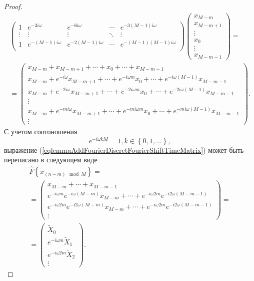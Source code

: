 \begin{proof}
\begin{eqnarray}
\begin{pmatrix}
1 & e^{-3 i \omega} & e^{-6 i \omega} & \cdots & 
e^{-3 \left( M - 1 \right) i \omega} \\
\vdots & \vdots & \vdots & \ddots & \vdots \\
1 & e^{-\left( M - 1 \right) i \omega} & e^{-2\left( M - 1 \right) i \omega} & \cdots & 
e^{- \left( M - 1 \right)\left( M - 1 \right) i \omega} \\
\end{pmatrix}
\begin{pmatrix}
x_{M - m} \\
x_{M - m + 1}\\ 
\vdots \\
x_0 \\
\vdots \\
x_{M - m - 1}
\end{pmatrix} = 
\nonumber \\
=
\begin{pmatrix}
x_{M - m} + x_{M - m + 1} + \cdots + x_0 + \cdots +
x_{M - m - 1}\\
x_{M - m} + 
e^{-i \omega} x_{M - m + 1} + 
\cdots + 
e^{-i \omega m  } x_0 + 
\cdots +
e^{-i \omega \left( M - 1 \right) } x_{M - m - 1}\\ 
x_{M - m} + 
e^{-2 i \omega} x_{M - m + 1} + 
\cdots + 
e^{-2 i \omega m  } x_0 + 
\cdots +
e^{-2 i \omega \left( M - 1 \right) } x_{M - m - 1}\\ 
\vdots \\
x_{M - m} + 
e^{-m i \omega} x_{M - m + 1} + 
\cdots + 
e^{-m i \omega m  } x_0 + 
\cdots +
e^{-m i \omega \left( M - 1 \right) } x_{M - m - 1}\\ 
\vdots 
\end{pmatrix}.
\label{eqlemmaAddFourierDiscretFourierShiftTimeMatrix}
\end{eqnarray}
С учетом соотоношения
\[
e^{-i \omega k M} = 1, k \in \left\{0, 1, \dots \right\},
\]
выражение
(\ref{eqlemmaAddFourierDiscretFourierShiftTimeMatrix}) может
быть переписано в следующем виде
\begin{eqnarray}
\hat{F}\left\{x_{\left(n - m\right) \mod M}\right\} = 
\nonumber \\
=
\begin{pmatrix}
x_{M - m} + \cdots +
x_{M - m - 1}\\
e^{-i \omega m } e^{-i \omega \left( M - m \right) } x_{M - m} + 
\cdots + 
e^{-i \omega 2 m } e^{-i 2 \omega \left( M - m - 1\right) }\\ 
e^{-i \omega 2 m } e^{-i 2 \omega \left( M - m \right) } x_{M - m} + 
\cdots + 
e^{-i \omega 2 m } e^{-i 2 \omega \left( M - m - 1\right) }\\ 
\vdots 
\end{pmatrix} = 
\nonumber \\
=
\begin{pmatrix}
\tilde{X}_0 \\
e^{-i \omega m} \tilde{X}_1 \\
e^{-i \omega 2 m} \tilde{X}_2 \\
\vdots  
\end{pmatrix}.
\nonumber
\end{eqnarray}
\end{proof}


